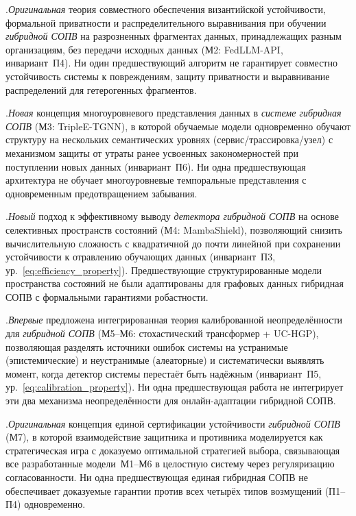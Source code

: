 .\quad \emph{Оригинальная} теория совместного обеспечения
византийской устойчивости, формальной приватности и распределительного
выравнивания при обучении \emph{гибридной СОПВ} на разрозненных
фрагментах данных, принадлежащих разным организациям, без передачи
исходных данных (М2: FedLLM-API, инвариант~П4). Ни один
предшествующий алгоритм не гарантирует совместно устойчивость
системы к повреждениям, защиту приватности и выравнивание
распределений для гетерогенных фрагментов.

.\quad \emph{Новая} концепция многоуровневого представления
данных в \emph{системе гибридная СОПВ} (М3: TripleE-TGNN), в которой
обучаемые модели одновременно обучают структуру на нескольких
семантических уровнях (сервис/трассировка/узел) с механизмом
защиты от утраты ранее усвоенных закономерностей при поступлении
новых данных (инвариант~П6). Ни одна предшествующая архитектура не
обучает многоуровневые темпоральные представления с одновременным
предотвращением забывания.

.\quad \emph{Новый} подход к эффективному выводу
\emph{детектора гибридной СОПВ} на основе селективных
пространств состояний (М4: MambaShield), позволяющий снизить
вычислительную сложность с квадратичной до почти линейной при
сохранении устойчивости к отравлению обучающих данных (инвариант~П3,
ур.~\eqref{eq:efficiency_property}). Предшествующие структурированные
модели пространства состояний не были адаптированы для графовых
данных гибридная СОПВ с формальными гарантиями робастности.

.\quad \emph{Впервые} предложена интегрированная теория
калиброванной неопределённости для \emph{гибридной СОПВ}
(М5--М6: стохастический трансформер + UC-HGP), позволяющая разделять
источники ошибок системы на устранимые (эпистемические) и неустранимые
(алеаторные) и систематически выявлять момент, когда детектор
системы перестаёт быть надёжным (инвариант~П5,
ур.~\eqref{eq:calibration_property}). Ни одна предшествующая работа
не интегрирует эти два механизма неопределённости для онлайн-адаптации
гибридной СОПВ.

.\quad \emph{Оригинальная} концепция единой сертификации
устойчивости \emph{гибридной СОПВ} (М7), в которой
взаимодействие защитника и противника моделируется как стратегическая
игра с доказуемо оптимальной стратегией выбора, связывающая все
разработанные модели~М1--М6 в целостную систему через регуляризацию
согласованности. Ни одна предшествующая единая гибридная СОПВ
не обеспечивает доказуемые гарантии против всех четырёх типов
возмущений (П1--П4) одновременно.

